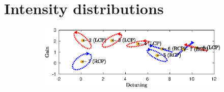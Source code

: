 \chapter{Intensity distributions}
\label{chap:intensities}

\begin{figure}
	\centering
	\begin{subfigure}{\linewidth}
		\includegraphics[width=\linewidth]{plots/defect/modes_found_oseen}
		\caption{}
	\end{subfigure}
	\begin{subfigure}{\linewidth}
		\centering

\end{subfigure}
\end{figure}
